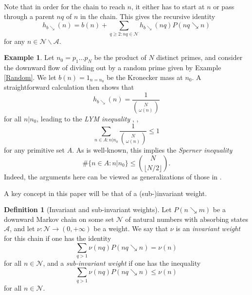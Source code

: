 \documentclass[12pt]{amsart}
\theoremstyle{definition}
\newtheorem{definition}[theorem]{Definition}
\newtheorem{example}[theorem]{Example}
\theoremstyle{remark}
\numberwithin{equation}{section}
\newcommand{\1}{{\mathbf 1}}
\begin{document}
Note that in order for the chain to reach $n$, it either has to start at $n$ or pass through a parent $nq$ of $n$ in the chain.  This gives the recursive identity
\begin{equation}\label{h-recurse}
 h_{b\searrow}(n) = b(n) + \sum_{q \geq 2: nq \in {\mathcal N}} h_{b\searrow}(nq) P(nq \searrow n)
\end{equation}
for any $n \in {\mathcal N} \backslash {\mathcal A}$.

\begin{example}  Let $n_0 = p_1 \dots p_N$  be the product of $N$ distinct primes, and consider the downward flow of dividing out by a random prime given by Example \ref{Random}.  We let $b(n) = 1_{n=n_0}$ be the Kronecker mass at $n_0$.  A straightforward calculation then shows that
$$ h_{b \searrow}(n) = \frac{1}{\binom{N}{\omega(n)}}$$
for all $n|n_0$, leading to the \emph{LYM inequality} \cite{lubell}, \cite{meshalkin}, \cite{yamamoto}
$$ \sum_{n \in A: n | n_0} \frac{1}{\binom{N}{\omega(n)}} \leq 1$$
for any primitive set $A$.  As is well-known, this implies the \emph{Sperner inequality} \cite{sperner}
$$ \# \{ n \in A : n | n_0\} \leq \binom{N}{\lfloor N/2 \rfloor}.$$
Indeed, the arguments here can be viewed as generalizations of those in \cite{lubell}.
\end{example}

A key concept in this paper will be that of a (sub-)invariant weight.

\begin{definition}[Invariant and sub-invariant weights]  Let $P(n \searrow m)$ be a downward Markov chain on some set ${\mathcal N}$ of natural numbers with absorbing states ${\mathcal A}$, and let $\nu \colon {\mathcal N} \to (0,+\infty)$ be a weight.  We say that $\nu$ is an \emph{invariant weight} for this chain if one has the identity
\begin{equation}\label{inv}
\sum_{q > 1}  \nu(nq) P( nq \searrow n ) = \nu(n)
\end{equation}
for all $n \in {\mathcal N}$, and a \emph{sub-invariant weight} if one has the inequality
\begin{equation}\label{sub}
\sum_{q > 1} \nu(nq) P( nq \searrow n )  \leq \nu(n)
\end{equation}
for all $n \in {\mathcal N}$.
\end{definition}
\end{document}
